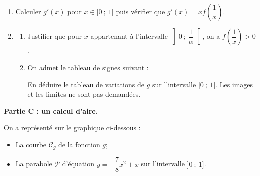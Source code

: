 \begin{enumerate}
	\item Calculer $g'(x)$ pour $x \in ] 0~;~1]$ puis vérifier que $g'(x)=x f\left(\dfrac{1}{x}\right)$.

	\item \begin{enumerate}
		\item Justifier que pour $x$ appartenant à l'intervalle $\left] 0~;~\dfrac{1}{\alpha}\right[$, on a $f\left(\dfrac{1}{x}\right)>0$.

		\item On admet le tableau de signes suivant :

		\begin{center}
		\end{center}

		En déduire le tableau de variations de $g$ sur l'intervalle $] 0~;~1]$. Les images et les limites ne sont pas demandées.
		\end{enumerate}
	\end{enumerate}

\medskip

\textbf{Partie C : un calcul d'aire.}

\smallskip

On a représenté sur le graphique ci-dessous :

\begin{itemize}
\item La courbe $\mathcal{C}_{g}$ de la fonction $g$;

\item La parabole $\mathcal{P}$ d'équation $y=-\dfrac{7}{8} x^{2}+x$ sur l'intervalle $]0~;~1]$.

\end{itemize}

